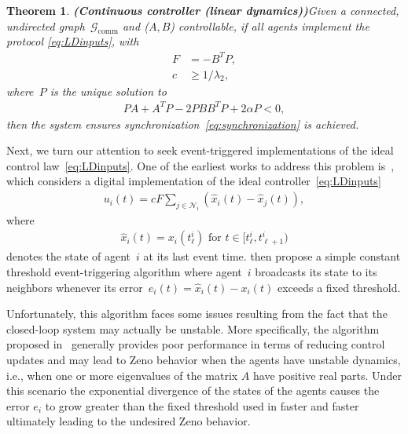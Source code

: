 \documentclass{autart}
\newtheorem{theorem}{Theorem}[section]
\newcommand{\GG}{{\mathcal{G}}}
\newcommand{\commgraph}{\GG_\text{comm}}
\renewcommand{\hat}{\widehat}
\newcommand{\longthmtitle}[1]{\mbox{}\textup{\textbf{(#1)}}}
\begin{document}
\begin{theorem}\longthmtitle{Continuous controller (linear
    dynamics)}\label{th:ConsLin}
  Given {a connected, undirected graph~$\commgraph$ and}
  ($A,B$) controllable, if all agents implement the protocol
  \eqref{eq:LDinputs}, with
  \begin{align}
    F&=-B^TP, \label{eq:F}\\
    c&\geq1/\lambda_2, \label{eq:c}
  \end{align}
  where~$P$ is the unique solution to
  \begin{align}
    PA+A^TP-2PBB^TP+2\alpha P<0, \label{eq:LMI}
  \end{align}
  then the system ensures synchronization~\eqref{eq:synchronization} is achieved.
\end{theorem}
Next, we turn our attention to seek event-triggered implementations of
the ideal control law~\eqref{eq:LDinputs}. One of the earliest works
to address this problem is~\citep{WZ-ZJ-GF:14}, which
considers a digital implementation of the ideal
controller~\eqref{eq:LDinputs}
\begin{align}\label{eq:LDinputsZOH}
  u_i(t)=cF\sum_{j\in\mathcal{N}_i}(\hat{x}_i(t) - \hat{x}_j(t)), 
\end{align}
where
\begin{align}
  \hat{x}_i(t) = x_i(t_\ell^i) \text{ for } t \in [t_\ell^i, t_{\ell+1}^i )
\end{align}
denotes the state of agent~$i$ at its last event
time. \cite{WZ-ZJ-GF:14} then propose a simple constant threshold
event-triggering algorithm where agent~$i$ broadcasts its state to its
neighbors whenever its error~$e_i(t) = \hat{x}_i(t) - x_i(t)$ exceeds
a fixed threshold.

Unfortunately, this algorithm faces some issues resulting from the
fact that the closed-loop system may actually be unstable. More
specifically, the algorithm proposed in~\citep{WZ-ZJ-GF:14} generally
provides poor performance in terms of reducing control updates and may
lead to Zeno behavior when the agents have unstable dynamics, i.e.,
when one or more eigenvalues of the matrix $A$ have positive real
parts. Under this scenario the exponential divergence of the states of
the agents causes the error $e_i$ to grow greater than the fixed
threshold used in \cite{WZ-ZJ-GF:14} faster and faster ultimately
leading to the undesired Zeno behavior.
\end{document}
